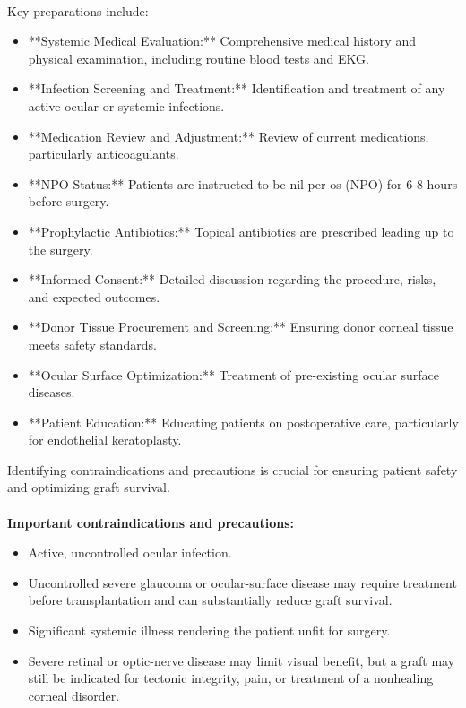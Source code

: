 \paragraph{}
Key preparations include:

\begin{itemize}
  \item **Systemic Medical Evaluation:** Comprehensive medical history and physical examination, including routine blood tests and EKG.
  \item **Infection Screening and Treatment:** Identification and treatment of any active ocular or systemic infections.
  \item **Medication Review and Adjustment:** Review of current medications, particularly anticoagulants.
  \item **NPO Status:** Patients are instructed to be nil per os (NPO) for 6-8 hours before surgery.
  \item **Prophylactic Antibiotics:** Topical antibiotics are prescribed leading up to the surgery.
  \item **Informed Consent:** Detailed discussion regarding the procedure, risks, and expected outcomes.
  \item **Donor Tissue Procurement and Screening:** Ensuring donor corneal tissue meets safety standards.
  \item **Ocular Surface Optimization:** Treatment of pre-existing ocular surface diseases.
  \item **Patient Education:** Educating patients on postoperative care, particularly for endothelial keratoplasty.
\end{itemize}

Identifying contraindications and precautions is crucial for ensuring patient safety and optimizing graft survival.

\paragraph{}
\textbf{Important contraindications and precautions:}
\begin{itemize}
  \item Active, uncontrolled ocular infection.
  \item Uncontrolled severe glaucoma or ocular-surface disease may require treatment before transplantation and can substantially reduce graft survival.
  \item Significant systemic illness rendering the patient unfit for surgery.
  \item Severe retinal or optic-nerve disease may limit visual benefit, but a graft may still be indicated for tectonic integrity, pain, or treatment of a nonhealing corneal disorder.
\end{itemize}


